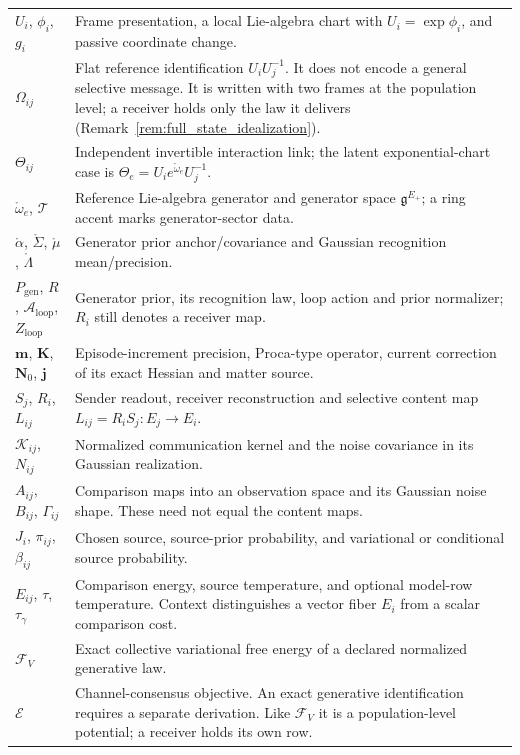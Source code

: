 {\begin{longtable}{@{}p{}p{}@{}}
$U_i$, $\phi_i$, $g_i$ & Frame presentation, a local Lie-algebra chart with $U_i=\exp\phi_i$, and passive coordinate change.\\
$\Omega_{ij}$ & Flat reference identification $U_iU_j^{-1}$. It does not encode a general selective message. It is written with two frames at the population level; a receiver holds only the law it delivers (Remark~\ref{rem:full_state_idealization}).\\
$\Theta_{ij}$ & Independent invertible interaction link; the latent exponential-chart case is $\Theta_e=U_i e^{\mathring\omega_e}U_j^{-1}$.\\
$\mathring\omega_e$, $\mathcal T$ & Reference Lie-algebra generator and generator space $\mathfrak g^{E_+}$; a ring accent marks generator-sector data.\\
$\mathring\alpha$, $\mathring\Sigma$, $\mathring\mu$, $\mathring\Lambda$ & Generator prior anchor/covariance and Gaussian recognition mean/precision.\\
$P_{\mathrm{gen}}$, $R$, $\mathcal A_{\mathrm{loop}}$, $Z_{\mathrm{loop}}$ & Generator prior, its recognition law, loop action and prior normalizer; $R_i$ still denotes a receiver map.\\
$\mathbf m$, $\mathbf K$, $\mathbf N_0$, $\mathbf j$ & Episode-increment precision, Proca-type operator, current correction of its exact Hessian and matter source.\\
$S_j$, $R_i$, $L_{ij}$ & Sender readout, receiver reconstruction and selective content map $L_{ij}=R_iS_j:E_j\to E_i$.\\
$\mathcal K_{ij}$, $N_{ij}$ & Normalized communication kernel and the noise covariance in its Gaussian realization.\\
$A_{ij}$, $B_{ij}$, $\Gamma_{ij}$ & Comparison maps into an observation space and its Gaussian noise shape. These need not equal the content maps.\\
$J_i$, $\pi_{ij}$, $\beta_{ij}$ & Chosen source, source-prior probability, and variational or conditional source probability.\\
$E_{ij}$, $\tau$, $\tau_\gamma$ & Comparison energy, source temperature, and optional model-row temperature. Context distinguishes a vector fiber $E_i$ from a scalar comparison cost.\\
$\mathcal F_V$ & Exact collective variational free energy of a declared normalized generative law.\\
$\mathcal E$ & Channel-consensus objective. An exact generative identification requires a separate derivation. Like $\mathcal F_V$ it is a population-level potential; a receiver holds its own row.\\

\end{longtable}}
